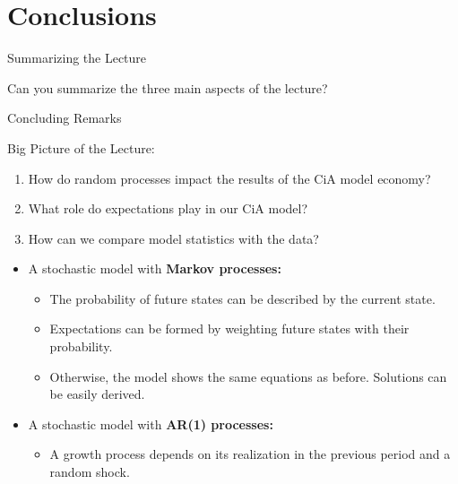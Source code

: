 \documentclass[10pt,c,aspectratio=1610,handout]{beamer}
\begin{document}
\section{Conclusions}%
\begin{frame}{Summarizing the Lecture}%
  \begin{center}%
    \begin{large}%
      Can you summarize the three main aspects of the lecture?%
    \end{large}%
  \end{center}%
\end{frame}%
\begin{frame}{Concluding Remarks}%
  \begin{block}{Big Picture of the Lecture:}%
    \begin{enumerate}%
      \item How do random processes impact the results of the CiA model economy?%
      \item What role do expectations play in our CiA model?%
      \item How can we compare model statistics with the data?%
    \end{enumerate}%
  \end{block}%
  \vspace*{0.1in}%
  \pause%
  \begin{itemize}%
    \item[$\blacktriangleright$] A stochastic model with \textbf{Markov processes:}%
    \begin{itemize}%
      \item[$\rightarrow$] The probability of future states can be described by the current state.%
      \item[$\rightarrow$] Expectations can be formed by weighting future states with their probability.%
      \item[$\rightarrow$] Otherwise, the model shows the same equations as before. Solutions can be easily derived.%
    \end{itemize}%
    \pause%
    \item[$\blacktriangleright$] A stochastic model with \textbf{AR(1) processes:}%
    \begin{itemize}%
      \item[$\rightarrow$] A growth process depends on its realization in the previous period and a random shock.%

\end{itemize}
\end{itemize}
\end{frame}
\end{document}
